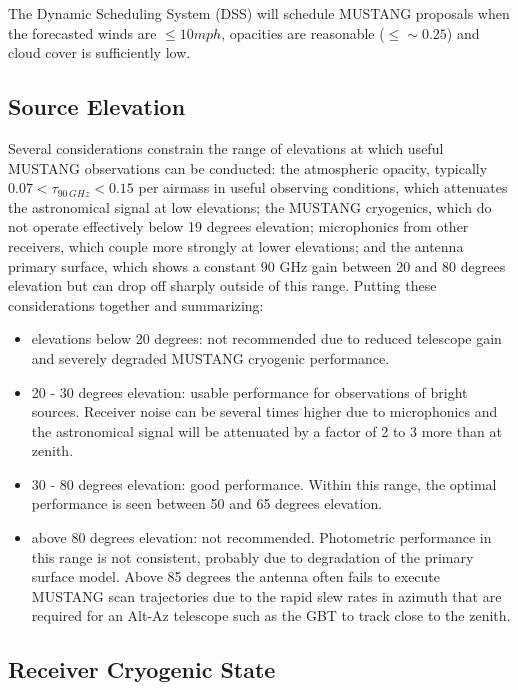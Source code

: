 The Dynamic Scheduling System (DSS) will schedule MUSTANG proposals when the 
forecasted winds are $\leq 10mph$, opacities are reasonable ($\leq\sim 0.25$) and cloud
cover is sufficiently low.

\subsection{Source Elevation}\label{sec:mussrcvis}

Several considerations constrain the range of elevations at which
useful MUSTANG observations can be conducted: the atmospheric opacity,
typically $0.07 < \tau_{90 \, GHz} < 0.15$ per airmass in useful
observing conditions, which attenuates the astronomical signal at low
elevations; the MUSTANG cryogenics, which do not operate effectively
below 19 degrees elevation; microphonics from other receivers, which
couple more strongly at lower elevations; and the antenna primary
surface, which shows a constant 90 GHz gain between 20 and 80 degrees
elevation but can drop off sharply outside of this range. Putting
these considerations together and summarizing:
\begin{itemize}
\item elevations below 20 degrees: not recommended due to reduced 
telescope gain and severely degraded MUSTANG cryogenic performance.
\item 20 - 30 degrees elevation: usable performance for observations of
bright sources. Receiver noise can be several times higher due to
microphonics and the astronomical signal will be attenuated by a factor
of 2 to 3 more than at zenith.
\item 30 - 80 degrees elevation: good performance. Within this range,
the optimal performance is seen between 50 and 65 degrees elevation.
\item above 80 degrees elevation: not recommended. Photometric
performance in this range is not consistent, probably due to
degradation of the primary surface model. Above 85 degrees the antenna
often fails to execute MUSTANG scan trajectories due to the rapid slew
rates in azimuth that are required for an Alt-Az telescope such as the
GBT to track close to the zenith.
\end{itemize}

\subsection{Receiver Cryogenic State}\label{sec:musrcvrvis}

